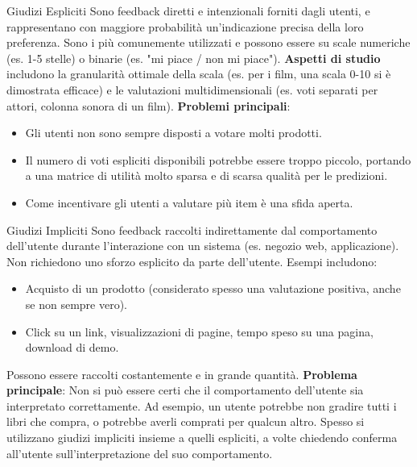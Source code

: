 \documentclass{article}
\begin{document}
\begin{definitionbox}{Giudizi Espliciti}
    Sono feedback diretti e intenzionali forniti dagli utenti, e rappresentano con maggiore probabilità un'indicazione precisa della loro preferenza. Sono i più comunemente utilizzati e possono essere su scale numeriche (es. 1-5 stelle) o binarie (es. "mi piace / non mi piace").
    \textbf{Aspetti di studio} includono la granularità ottimale della scala (es. per i film, una scala 0-10 si è dimostrata efficace) e le valutazioni multidimensionali (es. voti separati per attori, colonna sonora di un film).
    \textbf{Problemi principali}:
    \begin{itemize}
        \item Gli utenti non sono sempre disposti a votare molti prodotti.
        \item Il numero di voti espliciti disponibili potrebbe essere troppo piccolo, portando a una matrice di utilità molto sparsa e di scarsa qualità per le predizioni.
        \item Come incentivare gli utenti a valutare più item è una sfida aperta.
    \end{itemize}
\end{definitionbox}

\begin{definitionbox}{Giudizi Impliciti}
    Sono feedback raccolti indirettamente dal comportamento dell'utente durante l'interazione con un sistema (es. negozio web, applicazione). Non richiedono uno sforzo esplicito da parte dell'utente. Esempi includono:
    \begin{itemize}
        \item Acquisto di un prodotto (considerato spesso una valutazione positiva, anche se non sempre vero).
        \item Click su un link, visualizzazioni di pagine, tempo speso su una pagina, download di demo.
    \end{itemize}
    Possono essere raccolti costantemente e in grande quantità.
    \textbf{Problema principale}: Non si può essere certi che il comportamento dell'utente sia interpretato correttamente. Ad esempio, un utente potrebbe non gradire tutti i libri che compra, o potrebbe averli comprati per qualcun altro.
    Spesso si utilizzano giudizi impliciti insieme a quelli espliciti, a volte chiedendo conferma all'utente sull'interpretazione del suo comportamento.
\end{definitionbox}
\end{document}
